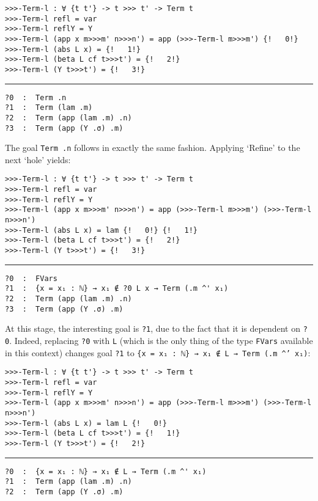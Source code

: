 \documentclass[a4paper, 12pt, twoside]{style/ociamthesis}
\let\OldTexttt\texttt
\renewcommand{\texttt}[1]{\small\OldTexttt{#1}}
\begin{document}
\begin{verbatim}
>>>-Term-l : ∀ {t t'} -> t >>> t' -> Term t
>>>-Term-l refl = var
>>>-Term-l reflY = Y
>>>-Term-l (app x m>>>m' n>>>n') = app (>>>-Term-l m>>>m') {!   0!}
>>>-Term-l (abs L x) = {!   1!}
>>>-Term-l (beta L cf t>>>t') = {!   2!}
>>>-Term-l (Y t>>>t') = {!   3!}
\end{verbatim}

\noindent\rule{8cm}{0.4pt}

\begin{verbatim}
?0  :  Term .n
?1  :  Term (lam .m)
?2  :  Term (app (lam .m) .n)
?3  :  Term (app (Y .σ) .m)
\end{verbatim}

The goal \texttt{Term .n} follows in exactly the same fashion. Applying
`Refine' to the next `hole' yields:

\begin{verbatim}
>>>-Term-l : ∀ {t t'} -> t >>> t' -> Term t
>>>-Term-l refl = var
>>>-Term-l reflY = Y
>>>-Term-l (app x m>>>m' n>>>n') = app (>>>-Term-l m>>>m') (>>>-Term-l n>>>n')
>>>-Term-l (abs L x) = lam {!   0!} {!   1!}
>>>-Term-l (beta L cf t>>>t') = {!   2!}
>>>-Term-l (Y t>>>t') = {!   3!}
\end{verbatim}

\noindent\rule{8cm}{0.4pt}

\begin{verbatim}
?0  :  FVars
?1  :  {x = x₁ : ℕ} → x₁ ∉ ?0 L x → Term (.m ^' x₁)
?2  :  Term (app (lam .m) .n)
?3  :  Term (app (Y .σ) .m)
\end{verbatim}

At this stage, the interesting goal is \texttt{?1}, due to the fact that
it is dependent on \texttt{?0}. Indeed, replacing \texttt{?0} with
\texttt{L} (which is the only thing of the type \texttt{FVars} available
in this context) changes goal \texttt{?1} to
\texttt{\{x = x₁ : ℕ\} → x₁ ∉ L → Term (.m \textasciicircum' x₁)}:

\begin{verbatim}
>>>-Term-l : ∀ {t t'} -> t >>> t' -> Term t
>>>-Term-l refl = var
>>>-Term-l reflY = Y
>>>-Term-l (app x m>>>m' n>>>n') = app (>>>-Term-l m>>>m') (>>>-Term-l n>>>n')
>>>-Term-l (abs L x) = lam L {!   0!}
>>>-Term-l (beta L cf t>>>t') = {!   1!}
>>>-Term-l (Y t>>>t') = {!   2!}
\end{verbatim}

\noindent\rule{8cm}{0.4pt}

\begin{verbatim}
?0  :  {x = x₁ : ℕ} → x₁ ∉ L → Term (.m ^' x₁)
?1  :  Term (app (lam .m) .n)
?2  :  Term (app (Y .σ) .m)
\end{verbatim}
\end{document}
